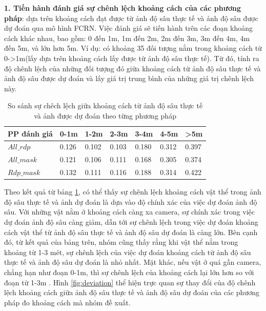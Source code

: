 \hspace{.2cm}\textbf{1. Tiến hành đánh giá sự chênh lệch khoảng cách của các phương pháp}: dựa trên khoảng cách đạt được từ ảnh độ sâu thực tế và ảnh độ sâu được dự đoán qua mô hình FCRN. Việc đánh giá sẽ tiến hành trên các đoạn khoảng cách khác nhau, bao gồm: 0 đến 1m, 1m đến 2m, 2m đến 3m, 3m đến 4m, 4m đến 5m, và lớn hơn 5m. Ví dụ: có khoảng 35 đối tượng nằm trong khoảng cách từ 0->1m(lấy dựa trên khoảng cách lấy được từ ảnh độ sâu thực tế). Từ đó, tính ra độ chênh lệch của những đối tượng đó giữa khoảng cách từ ảnh độ sâu thực tế và ảnh độ sâu được dự đoán và lấy giá trị trung bình của những giá trị chênh lệch này. 
\begin{table}[H]
\centering
\begin{tabular}{ |p{3cm}|p{1.5cm}|p{1.5cm}|p{1.5cm}|p{1.5cm}|p{1.5cm}|p{1.5cm}|}
\hline
PP đánh giá & 0-1m &  1-2m & 2-3m & 3-4m & 4-5m & >5m \\
\hline
$All\_rdp$ & 0.126 & 0.102 & 0.103 & 0.180 & 0.312 & 0.397 \\
\hline
$All\_mask$ & 0.121 &  0.106  & 0.111 & 0.168 & 0.305 & 0.374\\
\hline
$Rdp\_mask$ & 0.132& 0.111 & 0.116 & 0.188 & 0.314  & 0.422\\
\hline
\end{tabular}
\caption{So sánh sự chêch lệch giữa khoảng cách từ ảnh độ sâu thực tế và ảnh được dự đoán theo từng phương pháp}

\label{tab:compare_gtpred}
\end{table}

Theo kết quả từ bảng \ref{tab:compare_gtpred}, có thể thấy sự chênh lệch khoảng cách vật thể trong ảnh độ sâu thực tế và ảnh dự đoán là dựa vào độ chính xác của việc dự đoán ảnh độ sâu. Với những vật nằm ở khoảng cách càng xa camera, sự chính xác trong việc dự đoán ảnh độ sâu càng giảm, dẫn tới sự chênh lệch trong việc dự đoán khoảng cách vật thể từ ảnh độ sâu thực tế và ảnh độ sâu dự đoán là càng lớn. Bên cạnh đó, từ kết quả của bảng trên, nhóm cũng thấy rằng khi vật thể nằm trong khoảng từ 1-3 mét, sự chênh lệch của việc dự đoán khoảng cách từ ảnh độ sâu thực tế và ảnh độ sâu dự đoán là nhỏ nhất. Mặt khác, nếu vật ở quá gần camera, chẳng hạn như đoạn 0-1m, thì sự chênh lệch của khoảng cách lại lớn hơn so với đoạn từ 1-3m . Hình \ref{fig:deviation} thể hiện trực quan sự thay đổi của độ chênh lệch khoảng cách giữa ảnh độ sâu thực tế và ảnh độ sâu dự đoán của các phương pháp đo khoảng cách mà nhóm đề xuất.  

